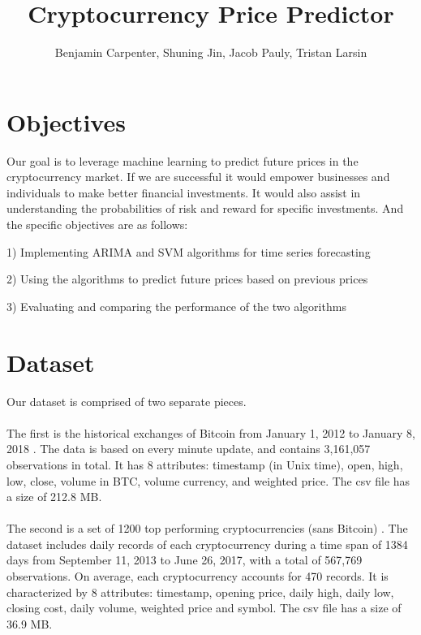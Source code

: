 \documentclass[11pt,a4paper]{article}
\begin{document}
\title{Cryptocurrency Price Predictor}
\author{Benjamin Carpenter, Shuning Jin, Jacob Pauly, Tristan Larsin}
\maketitle


\section{Objectives}
Our goal is to leverage machine learning to predict future prices in the cryptocurrency market. If we are successful it would empower businesses and individuals to make better financial investments. It would also assist in understanding the probabilities of risk and reward for specific investments. And the specific objectives are as follows:
\par
1) Implementing ARIMA and SVM algorithms for time series forecasting
\par
2) Using the algorithms to predict future prices based on previous prices
\par
3) Evaluating and comparing the performance of the two algorithms


\section{Dataset}
Our dataset is comprised of two separate pieces.
\\ \\
The first is the historical exchanges of Bitcoin from January 1, 2012 to January 8, 2018 \cite{bitcoin_set}. The data is based on every minute update, and contains 3,161,057 observations in total. It has 8 attributes: timestamp (in Unix time), open, high, low, close, volume in BTC, volume currency, and weighted price. The csv file has a size of 212.8 MB.
\\ \\
The second is a set of 1200 top performing cryptocurrencies (sans Bitcoin) \cite{crypto_set}. The dataset includes daily records of each cryptocurrency during a time span of 1384 days from September 11, 2013 to June 26, 2017, with a total of 567,769 observations. On average, each cryptocurrency accounts for 470 records. It is characterized by 8 attributes: timestamp, opening price, daily high, daily low, closing cost, daily volume, weighted price and symbol. The csv file has a size of 36.9 MB.
\end{document}
